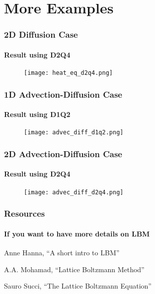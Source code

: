 \documentclass[12pt]{beamer}
\begin{document}
\section{More Examples}

\begin{frame}
  \frametitle{2D Diffusion Case}
  \framesubtitle{Result using D2Q4}

  \begin{figure}
    \centering
    \texttt{[image: heat\_eq\_d2q4.png]}
  \end{figure}

\end{frame}

\begin{frame}
  \frametitle{1D Advection-Diffusion Case}
  \framesubtitle{Result using D1Q2}

  \begin{figure}
    \centering
    \texttt{[image: advec\_diff\_d1q2.png]}
  \end{figure}
\end{frame}

\begin{frame}
  \frametitle{2D Advection-Diffusion Case}
  \framesubtitle{Result using D2Q4}

  \begin{figure}
    \centering
    \texttt{[image: advec\_diff\_d2q4.png]}
  \end{figure}

\end{frame}





\begin{frame}
  \frametitle{Resources}
  \framesubtitle{If you want to have more details on LBM}
  \begin{thebibliography}{10}

  \beamertemplatearticlebibitems

    Anne Hanna, ``A short intro to LBM''

    A.A. Mohamad, ``Lattice Boltzmann Method''

    Sauro Succi, ``The Lattice Boltzmann Equation''

  \end{thebibliography}
\end{frame}

\end{document}
